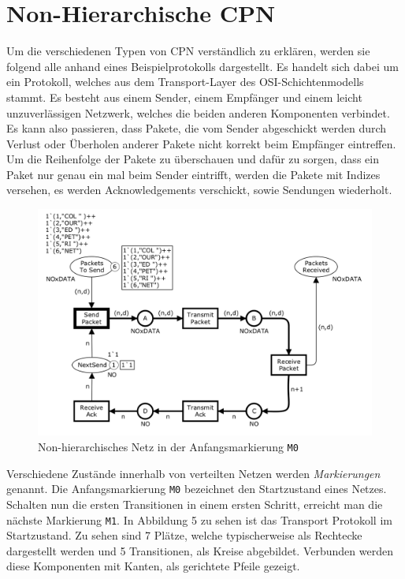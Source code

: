 \documentclass[11pt,onecolumn,a4paper,DIV=calc]{scrartcl}
\begin{document}
\section{Non-Hierarchische CPN}
Um die verschiedenen Typen von CPN verständlich zu erklären, werden sie folgend alle anhand eines Beispielprotokolls dargestellt. Es handelt sich dabei um ein Protokoll, welches aus dem Transport-Layer des OSI-Schichtenmodells stammt. Es besteht aus einem Sender, einem Empfänger und einem leicht unzuverlässigen Netzwerk, welches die beiden anderen Komponenten verbindet. Es kann also passieren, dass Pakete, die vom Sender abgeschickt werden durch Verlust oder Überholen anderer Pakete nicht korrekt beim Empfänger eintreffen. Um die Reihenfolge der Pakete zu überschauen und dafür zu sorgen, dass ein Paket nur genau ein mal beim Sender eintrifft, werden die Pakete mit Indizes versehen, es werden Acknowledgements verschickt, sowie Sendungen wiederholt.\\
\begin{figure}[h]
    \centering
    \includegraphics[scale=0.28]{non1.png}
    \caption{Non-hierarchisches Netz in der Anfangsmarkierung \texttt{M0}}
    \label{m0}
\end{figure}
Verschiedene Zustände innerhalb von verteilten Netzen werden \textit{Markierungen} genannt. Die Anfangsmarkierung \texttt{M0} bezeichnet den Startzustand eines Netzes. Schalten nun die ersten Transitionen in einem ersten Schritt, erreicht man die nächste Markierung \texttt{M1}.
In Abbildung 5 zu sehen ist das Transport Protokoll im Startzustand. Zu sehen sind 7 Plätze, welche typischerweise als Rechtecke dargestellt werden und 5 Transitionen, als Kreise abgebildet. Verbunden werden diese Komponenten mit Kanten, als gerichtete Pfeile gezeigt.\\
\end{document}
